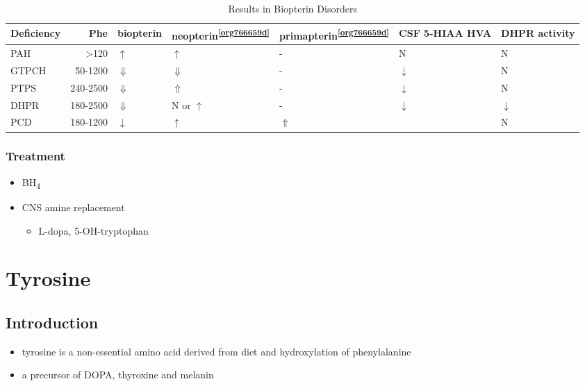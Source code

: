 \documentclass[12pt]{scrartcl}
\begin{document}
\begin{table}[htbp]
\caption{\label{tab:org4302788}Results in Biopterin Disorders}
\centering
\begin{tabular}{lrlllll}
Deficiency & Phe & biopterin\footnotemark & neopterin\textsuperscript{\ref{org766659d}} & primapterin\textsuperscript{\ref{org766659d}} & CSF 5-HIAA HVA & DHPR activity\\
\hline
PAH & \textgreater{}120 & \(\uparrow\) & \(\uparrow\) & - & N & N\\
GTPCH & 50-1200 & \(\Downarrow\) & \(\Downarrow\) & - & \(\downarrow\) & N\\
PTPS & 240-2500 & \(\Downarrow\) & \(\Uparrow\) & - & \(\downarrow\) & N\\
DHPR & 180-2500 & \(\Downarrow\) & N or \(\uparrow\) & - & \(\downarrow\) & \(\downarrow\)\\
PCD & 180-1200 & \(\downarrow\) & \(\uparrow\) & \(\Uparrow\) &  & N\\
\end{tabular}
\end{table}

\subsubsection{Treatment}
\label{sec:orgf6c6dd0}
\begin{itemize}
\item BH\textsubscript{4}
\item CNS amine replacement
\begin{itemize}
\item L-dopa, 5-OH-tryptophan
\end{itemize}
\end{itemize}

\section{Tyrosine}
\label{sec:orge70bc3e}
\subsection{Introduction}
\label{sec:org19387f6}
\begin{itemize}
\item tyrosine is a non-essential amino acid derived from diet and hydroxylation of phenylalanine
\item a precursor of DOPA, thyroxine and melanin
\end{itemize}
\end{document}
